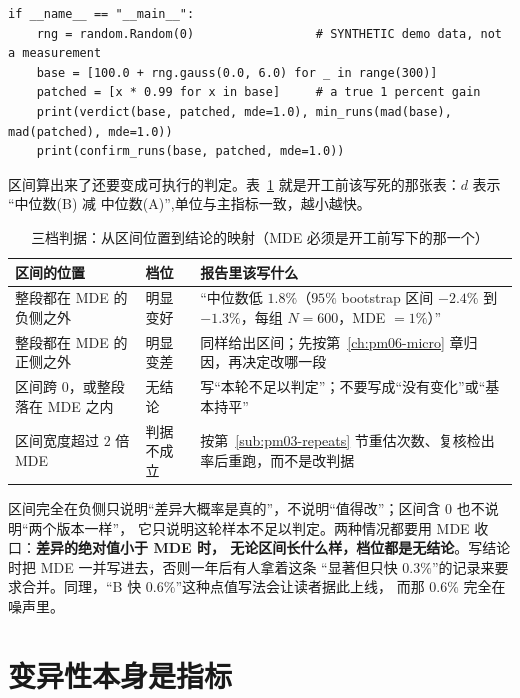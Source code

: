 \documentclass[12pt,a4paper,fontset=fandol]{ctexbook}
\newcommand{\Tp}[1]{\texttt{#1}}
\newcommand{\Lang}[1]{\textsf{#1}}
\newcommand{\PY}{\Lang{Python}}
\newcommand{\Mx}[1]{\textsf{#1}}
\begin{document}
\begin{lstlisting}[style=pythonstyle, caption={\textbf{可跑}：bootstrap 中位数差、三档判据、按 MDE 估最小重复次数与检出率复核（\PY 标准库实现，\Tp{numpy} 只用于加速；\texttt{\_\_main\_\_} 里的数据是合成的）}, label={lst:pm03-bootstrap}]
if __name__ == "__main__":
    rng = random.Random(0)                 # SYNTHETIC demo data, not a measurement
    base = [100.0 + rng.gauss(0.0, 6.0) for _ in range(300)]
    patched = [x * 0.99 for x in base]     # a true 1 percent gain
    print(verdict(base, patched, mde=1.0), min_runs(mad(base), mad(patched), mde=1.0))
    print(confirm_runs(base, patched, mde=1.0))
\end{lstlisting}

区间算出来了还要变成可执行的判定。表~\ref{tab:pm03-verdict} 就是开工前该写死的那张表：$d$ 表示
``中位数(B) 减 中位数(A)'',单位与主指标一致，越小越快。

\begin{table}[htbp]
\centering
\begin{tabular}{>{\raggedright\arraybackslash}p{} >{\raggedright\arraybackslash}p{} >{\raggedright\arraybackslash}p{}}
\toprule
区间的位置 & 档位 & 报告里该写什么 \\
\midrule
整段都在 \Mx{MDE} 的负侧之外 & 明显变好 &
``中位数低 $1.8\%$（$95\%$ bootstrap 区间 $-2.4\%$ 到 $-1.3\%$，每组 $N=600$，\Mx{MDE} $=1\%$）'' \\
整段都在 \Mx{MDE} 的正侧之外 & 明显变差 & 同样给出区间；先按第~\ref{ch:pm06-micro} 章归因，再决定改哪一段 \\
区间跨 $0$，或整段落在 \Mx{MDE} 之内 & 无结论 & 写``本轮不足以判定''；不要写成``没有变化''或``基本持平'' \\
区间宽度超过 $2$ 倍 \Mx{MDE} & 判据不成立 & 按第~\ref{sub:pm03-repeats} 节重估次数、复核检出率后重跑，而不是改判据 \\
\bottomrule
\end{tabular}
\caption{三档判据：从区间位置到结论的映射（\Mx{MDE} 必须是开工前写下的那一个）}\label{tab:pm03-verdict}
\end{table}

\begin{warning}[title={区间不跨过 $0$ 不等于``有意义''}, label={box:pm03-significance}]
区间完全在负侧只说明``差异大概率是真的''，不说明``值得改''；区间含 $0$ 也不说明``两个版本一样''，
它只说明这轮样本不足以判定。两种情况都要用 \Mx{MDE} 收口：\textbf{差异的绝对值小于 \Mx{MDE} 时，
无论区间长什么样，档位都是无结论}。写结论时把 \Mx{MDE} 一并写进去，否则一年后有人拿着这条
``显著但只快 $0.3\%$''的记录来要求合并。同理，``B 快 $0.6\%$''这种点值写法会让读者据此上线，
而那 $0.6\%$ 完全在噪声里。
\end{warning}

\section{变异性本身是指标}
\label{sec:pm03-variability}
\end{document}
